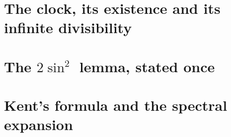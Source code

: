 \section{The clock, its existence and its infinite divisibility}

\section{The $2\sin^2$ lemma, stated once}

\section{Kent's formula and the spectral expansion}

